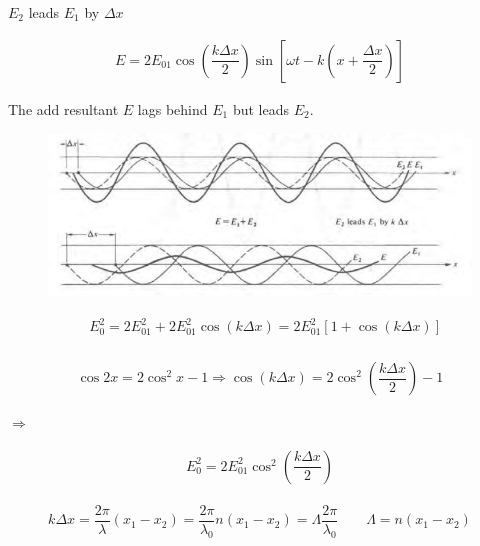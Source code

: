$E_2$ leads $E_1$ by $\Delta x$

\begin{equation*}
  \begin{aligned}
    E = 2 E_{01} \cos \left( \dfrac{k \Delta x}{2}  \right) \sin \left[ \omega t - k \left( x + \dfrac{\Delta x}{2}  \right) \right]
  \end{aligned}
\end{equation*}

The add resultant $E$ lags behind $E_1$ but leads $E_2$.

\begin{figure}[H]
  \centering
  \includegraphics[width=0.9\linewidth]{figures/add-resultant.png}
\end{figure}

\begin{equation*}
  \begin{aligned}
      & E_0^2 = 2 E_{01}^2 + 2 E_{01}^2 \cos \left( k \Delta x \right) = 2 E_{01}^2 \left[ 1 + \cos \left( k \Delta x \right) \right] \\
  \end{aligned}
\end{equation*}

\begin{equation*}
  \begin{aligned}
    \cos 2x = 2 \cos^2 x - 1 \Rightarrow \cos \left( k \Delta x \right) = 2 \cos^2 \left( \dfrac{k \Delta x}{2}  \right) - 1
  \end{aligned}
\end{equation*}

$\Rightarrow$

\begin{equation*}
  \begin{aligned}
    E_0^2 = 2 E_{01}^2 \cos^2 \left( \dfrac{k \Delta x}{2}  \right)
  \end{aligned}
\end{equation*}

\begin{equation*}
  \begin{aligned}
    k \Delta x = \dfrac{2 \pi}{\lambda} \left( x_1 - x_2 \right) = \dfrac{2 \pi}{\lambda_0} n \left( x_1 - x_2 \right) = \Lambda \dfrac{2 \pi}{\lambda_0} \quad\quad \Lambda = n \left( x_1 - x_2 \right)
  \end{aligned}
\end{equation*}

